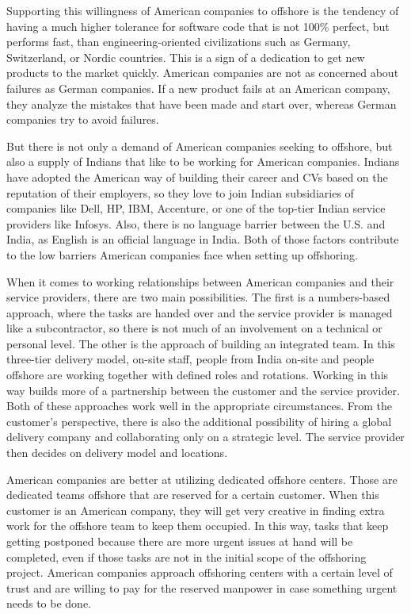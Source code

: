 Supporting this willingness of American companies to offshore is the tendency of having a much higher tolerance for software code that is not 100\% perfect, but performs fast, than engineering-oriented civilizations such as Germany, Switzerland, or Nordic countries. This is a sign of a dedication to get new products to the market quickly. American companies are not as concerned about failures as German companies. If a new product fails at an American company, they analyze the mistakes that have been made and start over, whereas German companies try to avoid failures.

But there is not only a demand of American companies seeking to offshore, but also a supply of Indians that like to be working for American companies. Indians have adopted the American way of building their career and CVs based on the reputation of their employers, so they love to join Indian subsidiaries of companies like Dell, HP, IBM, Accenture, or one of the top-tier Indian service providers like Infosys. Also, there is no language barrier between the U.S. and India,  as English is an official language in India. Both of those factors contribute to the low barriers American companies face when setting up offshoring.

When it comes to working relationships between American companies and their service providers, there are two main possibilities. The first is a numbers-based approach, where the tasks are handed over and the service provider is managed like a subcontractor, so there is not much of an involvement on a technical or personal level. The other is the approach of building an integrated team. In this three-tier delivery model, on-site staff, people from India on-site and people offshore are working together with defined roles and rotations. Working in this way builds more of a partnership between the customer and the service provider. Both of these approaches work well in the appropriate circumstances. From the customer's perspective, there is also the additional possibility of hiring a global delivery company and collaborating only on a strategic level. The service provider then decides on delivery model and locations.

American companies are better at utilizing dedicated offshore centers. Those are dedicated teams offshore that are reserved for a certain customer. When this customer is an American company, they will get very creative in finding extra work for the offshore team to keep them occupied. In this way, tasks that keep getting postponed because there are more urgent issues at hand will be completed, even if those tasks are not in the initial scope of the offshoring project. American companies approach offshoring centers with a certain level of trust and are willing to pay for the reserved manpower in case something urgent needs to be done. 

